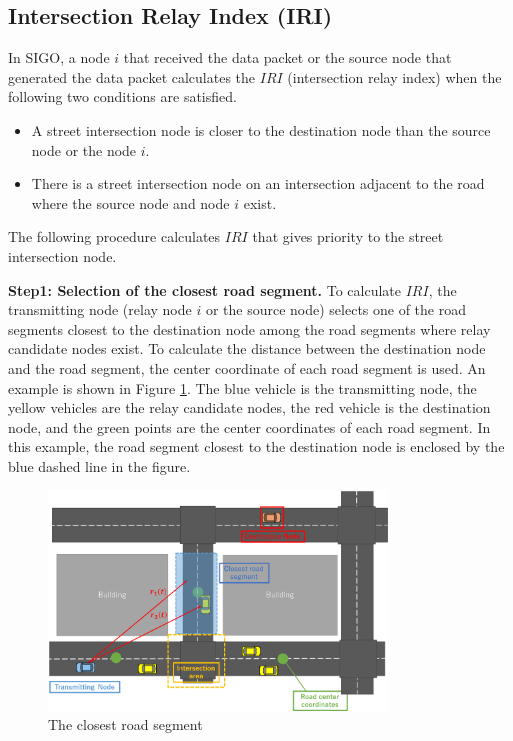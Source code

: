\documentclass[conference]{IEEEtran}
\begin{document}
\subsection{Intersection Relay Index (IRI)}

In SIGO, a node $i$ that received the data packet or the  source node that generated the data packet calculates the 
$IRI$ (intersection relay index) when the following two conditions are satisfied.
\begin{itemize}
\item A street intersection node is closer to the destination node than the source node or the node $i$.
\item There is a street intersection node on an intersection adjacent to the road where the source node and node $i$ exist.
\end{itemize}

The following procedure calculates $IRI$ that gives priority to  the street intersection node.

\textbf{Step1: Selection of the closest road segment.}
To calculate $IRI$, the transmitting node (relay node $i$ or the source node) selects one of the road segments closest to the destination node among the road segments where relay candidate nodes exist.
To calculate the distance between the destination node and the road segment, the center coordinate of each road segment is used. An example is shown in Figure \ref{fig:closest_road}.
The blue vehicle is the transmitting node, the yellow vehicles are the relay candidate nodes, the red vehicle is the destination node, and the green points are the center coordinates of each road segment. In this example, the road segment closest to the destination node is  enclosed by the blue dashed line in the figure.


\begin{figure}[!ht]
\centering
\includegraphics[width=90mm]{figures/closest_road.eps}
\caption{The closest road segment}
\label{fig:closest_road}
\end{figure}
\end{document}

